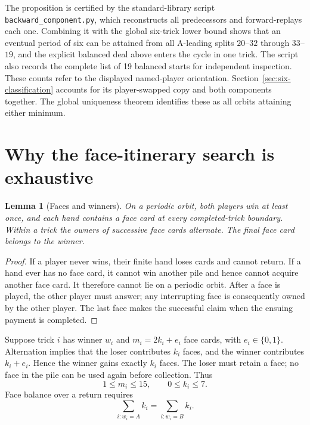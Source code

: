 \documentclass[11pt]{article}
\newtheorem{lemma}{Lemma}
\newcommand{\word}[1]{\texttt{#1}}
\begin{document}
The proposition is certified by the standard-library script
\word{backward\_component.py}, which reconstructs all predecessors and
forward-replays each one. Combining it with the global six-trick lower bound
shows that an eventual period of six can be attained from all A-leading
splits $20$--$32$ through $33$--$19$, and the explicit balanced deal above
enters the cycle in one trick. The script also records the complete list of
19 balanced starts for independent inspection. These counts refer to the
displayed named-player orientation. Section~\ref{sec:six-classification}
accounts for its player-swapped copy and both components together. The global
uniqueness theorem identifies these as all orbits attaining either minimum.

\section{Why the face-itinerary search is exhaustive}\label{sec:faces}

\begin{lemma}[Faces and winners]
On a periodic orbit, both players win at least once, and each hand contains
a face card at every completed-trick boundary. Within a trick the owners of
successive face cards alternate. The final face card belongs to the winner.
\end{lemma}
\begin{proof}
If a player never wins, their finite hand loses cards and cannot return.
If a hand ever has no face card, it cannot win another pile and hence cannot
acquire another face card. It therefore cannot lie on a periodic orbit.
After a face is played, the other player must answer; any interrupting face
is consequently owned by the other player. The last face makes the successful
claim when the ensuing payment is completed.
\end{proof}

Suppose trick $i$ has winner $w_i$ and $m_i=2k_i+e_i$ face cards, with
$e_i\in\{0,1\}$. Alternation implies that the loser contributes $k_i$ faces,
and the winner contributes $k_i+e_i$. Hence the winner gains exactly $k_i$
faces. The loser must retain a face; no face in the pile can be used again
before collection. Thus
\[
1\le m_i\le15,\qquad 0\le k_i\le7.
\]
Face balance over a return requires
\[
\sum_{i:w_i=A} k_i=\sum_{i:w_i=B}k_i.
\]
\end{document}

